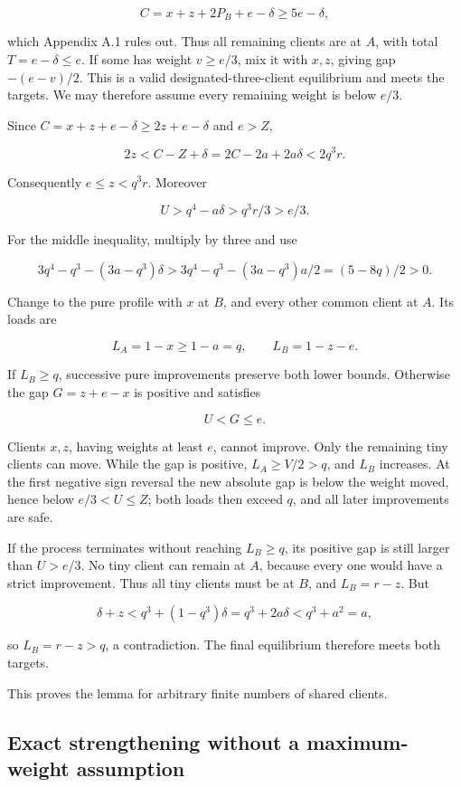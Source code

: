 \documentclass[11pt,a4paper]{article}
\begin{document}
\[
C=x+z+2P_B+e-\delta\ge5e-\delta,
\]

which Appendix A.1 rules out. Thus all remaining clients are at \(A\), with total \(T=e-\delta\le e\). If some has weight \(v\ge e/3\), mix it with \(x,z\), giving gap \(-(e-v)/2\). This is a valid designated-three-client equilibrium and meets the targets. We may therefore assume every remaining weight is below \(e/3\).

Since \(C=x+z+e-\delta\ge2z+e-\delta\) and \(e>Z\),

\[
2z<C-Z+\delta=2C-2a+2a\delta<2q^3r.
\]

Consequently \(e\le z<q^3r\). Moreover

\[
U>q^4-a\delta>q^3r/3>e/3.
\]

For the middle inequality, multiply by three and use

\[
3q^4-q^3-(3a-q^3)\delta>
3q^4-q^3-(3a-q^3)a/2=(5-8q)/2>0.
\]

Change to the pure profile with \(x\) at \(B\), and every other common client at \(A\). Its loads are

\[
L_A=1-x\ge1-a=q,\qquad L_B=1-z-e.
\]

If \(L_B\ge q\), successive pure improvements preserve both lower bounds. Otherwise the gap \(G=z+e-x\) is positive and satisfies

\[
U<G\le e.
\]

Clients \(x,z\), having weights at least \(e\), cannot improve. Only the remaining tiny clients can move. While the gap is positive, \(L_A\ge V/2>q\), and \(L_B\) increases. At the first negative sign reversal the new absolute gap is below the weight moved, hence below \(e/3<U\le Z\); both loads then exceed \(q\), and all later improvements are safe.

If the process terminates without reaching \(L_B\ge q\), its positive gap is still larger than \(U>e/3\). No tiny client can remain at \(A\), because every one would have a strict improvement. Thus all tiny clients must be at \(B\), and \(L_B=r-z\). But

\[
\delta+z<q^3+(1-q^3)\delta
=q^3+2a\delta<q^3+a^2=a,
\]

so \(L_B=r-z>q\), a contradiction. The final equilibrium therefore meets both targets.

This proves the lemma for arbitrary finite numbers of shared clients.

\hypertarget{exact-strengthening-without-a-maximum-weight-assumption}{%
\subsection{Exact strengthening without a maximum-weight assumption}\label{exact-strengthening-without-a-maximum-weight-assumption}}
\end{document}
